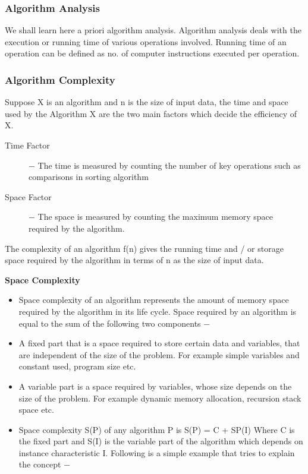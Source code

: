 \documentclass{beamer}
\begin{document}
\begin{frame}
	\frametitle{Algorithm Analysis}
We shall learn here a priori algorithm analysis. Algorithm analysis deals with the execution or running time of various operations involved. Running time of an operation can be defined as no. of computer instructions executed per operation.
\end{frame}
\begin{frame}
\frametitle{Algorithm Complexity}
Suppose X is an algorithm and n is the size of input data, the time and space used by the Algorithm X are the two main factors which decide the efficiency of X.
\begin{description}
\item[Time Factor] − The time is measured by counting the number of key operations such as comparisons in sorting algorithm

\item[Space Factor] − The space is measured by counting the maximum memory space required by the algorithm.
\end{description}
The complexity of an algorithm f(n) gives the running time and / or storage space required by the algorithm in terms of n as the size of input data.
\end{frame}
\begin{frame}
\noindent \textbf{Space Complexity}
\begin{itemize}
\item Space complexity of an algorithm represents the amount of memory space required by the algorithm in its life cycle. Space required by an algorithm is equal to the sum of the following two components −
	
\item A fixed part that is a space required to store certain data and variables, that are independent of the size of the problem. For example simple variables and constant used, program size etc.
\end{itemize}

\end{frame}
\begin{frame}
	\begin{itemize}
\item A variable part is a space required by variables, whose size depends on the size of the problem. For example dynamic memory allocation, recursion stack space etc.

\item Space complexity S(P) of any algorithm P is S(P) = C + SP(I) Where C is the fixed part and S(I) is the variable part of the algorithm which depends on instance characteristic I. Following is a simple example that tries to explain the concept −
\end{itemize}
\end{frame}
\end{document}
